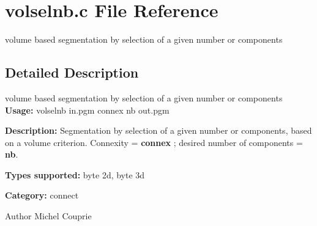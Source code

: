 \section{volselnb.c File Reference}
\label{volselnb_8c}


volume based segmentation by selection of a given number or components  




\subsection{Detailed Description}
volume based segmentation by selection of a given number or components {\bfseries Usage:} volselnb in.pgm connex nb out.pgm

{\bfseries Description:} Segmentation by selection of a given number or components, based on a volume criterion. Connexity = {\bfseries connex} ; desired number of components = {\bfseries nb}.

{\bfseries Types supported:} byte 2d, byte 3d

{\bfseries Category:} connect

\begin{DoxyAuthor}{Author}
Michel Couprie 
\end{DoxyAuthor}
